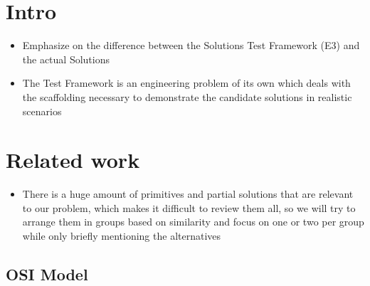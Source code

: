 \hypertarget{intro}{%
\chapter{Intro}\label{intro}}

\begin{itemize}
\tightlist
\item
  Emphasize on the difference between the Solutions Test Framework (E3)
  and the actual Solutions
\item
  The Test Framework is an engineering problem of its own which deals
  with the scaffolding necessary to demonstrate the candidate solutions
  in realistic scenarios
\end{itemize}

\hypertarget{related-work}{%
\chapter{Related work}\label{related-work}}

\begin{itemize}
\tightlist
\item
  There is a huge amount of primitives and partial solutions that are
  relevant to our problem, which makes it difficult to review them all,
  so we will try to arrange them in groups based on similarity and focus
  on one or two per group while only briefly mentioning the alternatives
\end{itemize}

\hypertarget{osi-model}{%
\section{OSI Model}\label{osi-model}}

